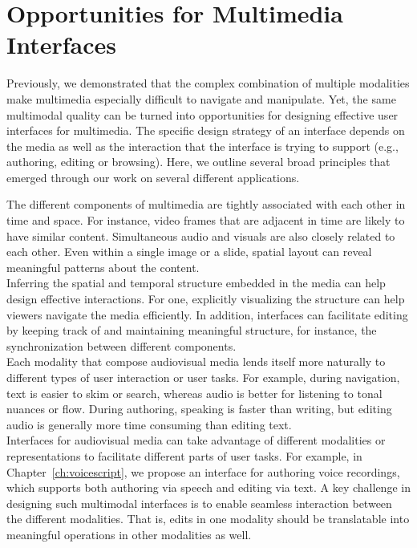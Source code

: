 \section{Opportunities for Multimedia Interfaces}
Previously, we demonstrated that the complex combination of multiple modalities make multimedia especially difficult to navigate and manipulate. Yet, the same multimodal quality can be turned into opportunities for designing effective user interfaces for multimedia. The specific design strategy of an interface depends on the media as well as the interaction that the interface is trying to support (e.g., authoring, editing or browsing). Here, we outline several broad principles that emerged through our work on several different applications.\\
%
\begin{mldescription}
 The different components of multimedia are tightly associated with each other in time and space. For instance, video frames that are adjacent in time are likely to have similar content. Simultaneous audio and visuals are also closely related to each other. Even within a single image or a slide, spatial layout can reveal meaningful patterns about the content.\\
Inferring the spatial and temporal structure embedded in the media can help design effective interactions. For one, explicitly visualizing the structure can help viewers navigate the media efficiently. In addition, interfaces can facilitate editing by keeping track of and maintaining meaningful structure, for instance, the synchronization between different components. \\
% 
 Each modality that compose audiovisual media lends itself more naturally to different types of user interaction or user tasks. For example, during navigation, text is easier to skim or search, whereas audio is better for listening to tonal nuances or flow. During authoring, speaking is faster than writing, but editing audio is generally more time consuming than editing text.\\
Interfaces for audiovisual media can take advantage of different modalities or representations to facilitate different parts of user tasks. For example, in Chapter~\ref{ch:voicescript}, we propose an interface for authoring voice recordings, which supports both authoring via speech and editing via text.  A key challenge in designing such multimodal interfaces is to enable seamless interaction between the different modalities. That is, edits in one modality should be translatable into meaningful operations in other modalities as well.  


\end{mldescription}

